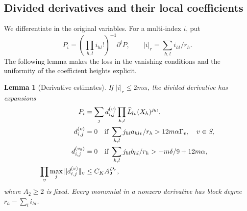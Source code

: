 \documentclass[11pt]{article}
\numberwithin{equation}{section}
\newtheorem{lemma}[theorem]{Lemma}
\theoremstyle{remark}\newtheorem{remark}[theorem]{Remark}
\begin{document}
\subsection{Divided derivatives and their local coefficients}
We differentiate in the original variables. For a multi-index $i$,
put
\[
 P_i=\left(\prod_{h,l}i_{hl}!\right)^{-1}\partial^iP,
 \qquad |i|_r=\sum_{h,l}i_{hl}/r_h.
\]
The following lemma makes the loss in the vanishing conditions and
the uniformity of the coefficient heights explicit.

\begin{lemma}[Derivative estimates]\label{lem:derivatives}
If $|i|_r\le2m\alpha$, the divided derivative has expansions
\begin{align}
 P_i&=\sum_jd^{(v)}_{i,j}\prod_{h,l}\widehat L_{lv}(X_h)^{j_{hl}},
       \label{eq:derivativeexp}\\
 d^{(v)}_{i,j}&=0\quad\text{if }\sum_{h,l}j_{hl}a_{hlv}/r_h
                   >12m\alpha\Gamma_v,\quad v\in S,
                   \label{eq:derivativeordinary}\\
 d^{(v_0)}_{i,j}&=0\quad\text{if }\sum_{h,l}j_{hl}b_{hl}/r_h
                  >-m\delta/9+12m\alpha,\label{eq:derivativespecial}\\
 \prod_v\max_j\|d^{(v)}_{i,j}\|_v&\le C_K A_2^{D_r},
       \label{eq:derivativeheight}
\end{align}
where $A_2\ge2$ is fixed. Every monomial in a nonzero derivative
has block degree $r_h-\sum_li_{hl}$.
\end{lemma}
\end{document}
